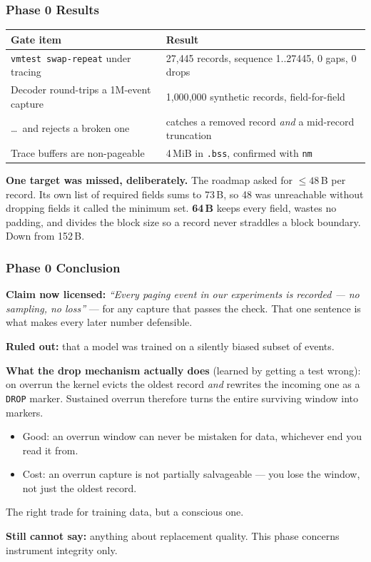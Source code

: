\documentclass[10pt,aspectratio=169]{beamer}
\newcommand{\good}[1]{\textcolor{good}{#1}}
\newcommand{\warn}[1]{\textcolor{warn}{#1}}
\newcommand{\phasehead}[2]{%
  \frametitle{#1 \quad\small\normalfont\textcolor{white!75!accent}{#2}}}
\begin{document}
\begin{frame}
  \phasehead{Phase 0}{Results}
  \small
  \begin{table}
    \begin{tabular}{@{}p{5.4cm}l@{}}
      \toprule
      \textbf{Gate item} & \textbf{Result} \\
      \midrule
      \texttt{vmtest swap-repeat} under tracing
        & \good{27{,}445 records, sequence 1..27445, 0 gaps, 0 drops} \\
      \addlinespace
      Decoder round-trips a 1M-event capture
        & \good{1{,}000{,}000 synthetic records, field-for-field} \\
      \addlinespace
      \dots\ and rejects a broken one
        & \good{catches a removed record \emph{and} a mid-record truncation} \\
      \addlinespace
      Trace buffers are non-pageable
        & \good{4\,MiB in \texttt{.bss}, confirmed with \texttt{nm}} \\
      \bottomrule
    \end{tabular}
  \end{table}

  \medskip
  \textbf{One target was missed, deliberately.} The roadmap asked for
  $\leq 48$\,B per record. Its own list of required fields sums to 73\,B, so 48
  was unreachable without dropping fields it called the minimum set.
  \textbf{64\,B} keeps every field, wastes no padding, and divides the block
  size so a record never straddles a block boundary. Down from 152\,B.
\end{frame}

\begin{frame}
  \phasehead{Phase 0}{Conclusion}
  \small
  \textbf{\good{Claim now licensed:}} \emph{``Every paging event in our
  experiments is recorded --- no sampling, no loss''} --- for any capture that
  passes the check. That one sentence is what makes every later number
  defensible.

  \medskip
  \textbf{Ruled out:} that a model was trained on a silently biased subset of
  events.

  \medskip
  \textbf{What the drop mechanism actually does} (learned by getting a test
  wrong): on overrun the kernel evicts the oldest record \emph{and} rewrites
  the incoming one as a \texttt{DROP} marker. Sustained overrun therefore
  turns the entire surviving window into markers.
  \begin{itemize}
    \item \good{Good:} an overrun window can never be mistaken for data,
          whichever end you read it from.
    \item \warn{Cost:} an overrun capture is not partially salvageable --- you
          lose the window, not just the oldest record.
  \end{itemize}
  The right trade for training data, but a conscious one.

  \medskip
  \textbf{Still cannot say:} anything about replacement quality. This phase
  concerns instrument integrity only.
\end{frame}
\end{document}
